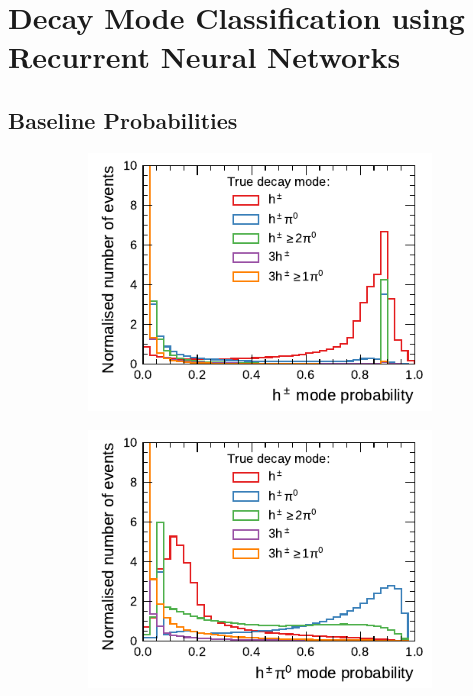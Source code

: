 \clearpage
\section{Decay Mode Classification using Recurrent Neural Networks}
\subsection{Baseline Probabilities}
\label{app:baseline_probabilities}

\begin{figure}[!ht]
  \begin{subfigure}{0.48\textwidth}
    \centering
    \includegraphics{./figures/decay_mode_classification/mode_proba_baseline_ptcut_1_5/proba_1p0n.pdf}
  \end{subfigure}\hfill
  \begin{subfigure}{0.48\textwidth}
    \centering
    \includegraphics{./figures/decay_mode_classification/mode_proba_baseline_ptcut_1_5/proba_1p1n.pdf}

\end{subfigure}
\end{figure}
